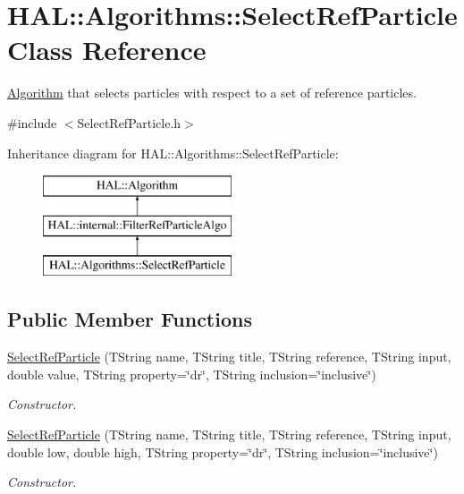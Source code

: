 \hypertarget{class_h_a_l_1_1_algorithms_1_1_select_ref_particle}{\section{H\+A\+L\+:\+:Algorithms\+:\+:Select\+Ref\+Particle Class Reference}
\label{class_h_a_l_1_1_algorithms_1_1_select_ref_particle}
}


\hyperlink{class_h_a_l_1_1_algorithm}{Algorithm} that selects particles with respect to a set of reference particles.  




{\ttfamily \#include $<$Select\+Ref\+Particle.\+h$>$}

Inheritance diagram for H\+A\+L\+:\+:Algorithms\+:\+:Select\+Ref\+Particle\+:\begin{figure}[H]
\begin{center}
\leavevmode
\includegraphics[height=3.000000cm]{class_h_a_l_1_1_algorithms_1_1_select_ref_particle}
\end{center}
\end{figure}
\subsection*{Public Member Functions}
\begin{DoxyCompactItemize}
\item 
\hyperlink{class_h_a_l_1_1_algorithms_1_1_select_ref_particle_af0c5f5e66e54f7bc102e32148867892e}{Select\+Ref\+Particle} (T\+String name, T\+String title, T\+String reference, T\+String input, double value, T\+String property=\char`\"{}dr\char`\"{}, T\+String inclusion=\char`\"{}inclusive\char`\"{})
\begin{DoxyCompactList}\small\item\em Constructor. \end{DoxyCompactList}\item 
\hyperlink{class_h_a_l_1_1_algorithms_1_1_select_ref_particle_a68f9c3c857223c9a84b73e1569cdecaf}{Select\+Ref\+Particle} (T\+String name, T\+String title, T\+String reference, T\+String input, double low, double high, T\+String property=\char`\"{}dr\char`\"{}, T\+String inclusion=\char`\"{}inclusive\char`\"{})
\begin{DoxyCompactList}\small\item\em Constructor. \end{DoxyCompactList}\end{DoxyCompactItemize}

